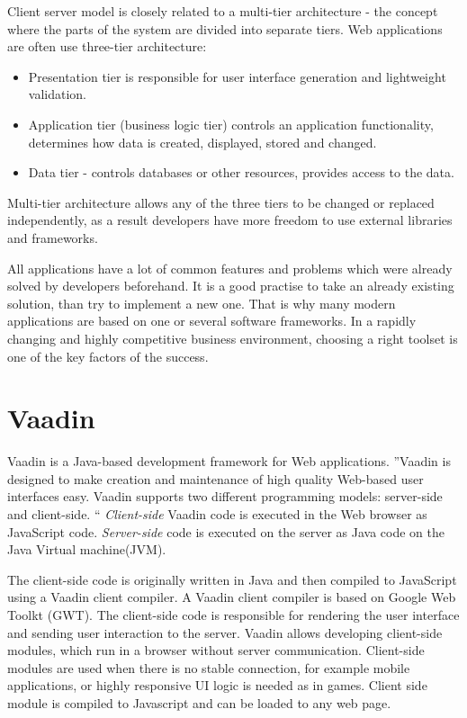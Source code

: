     	Client server model is closely related to a multi-tier architecture - the
    	concept where the parts of the system are divided into separate tiers. Web applications
    	 are often use three-tier architecture:
    	 \begin{itemize}
    	   \item Presentation tier is responsible for user interface generation and
    	   lightweight validation.
    	   \item Application tier (business logic tier) controls an application
    	   functionality, determines how data is created, displayed, stored and
    	   changed.
    	   \item Data tier - controls databases or other resources, provides access
    	   to the data.
    	 \end{itemize}
    	Multi-tier architecture allows any of the three tiers to be changed or
    	replaced independently, as a result developers have more freedom to use
    	external libraries and frameworks.
		
		All	applications have a lot of common features and problems which were already
		solved by developers beforehand. It is a good practise to take an already
		existing solution, than try to implement a new one. That is why many
		modern applications are based on one or several software frameworks. In a
		rapidly changing and highly competitive business environment, choosing a right toolset is one of
		the key factors of the success.	 	
		
  \section{Vaadin}
  \label{ch:vaadin}
    Vaadin is a Java-based development framework for Web applications. ''Vaadin
    is designed to make creation and maintenance of high quality Web-based user interfaces easy.
   Vaadin supports two different programming models: server-side and client-side. 
   `` \cite[pr1.1]{bookVaaidn}
   \emph{Client-side} Vaadin code is executed in the Web browser as JavaScript
   code.
   \emph{Server-side} code is executed on the server as Java code on the Java
   Virtual machine(JVM).

   The client-side code is originally written in Java and then
   compiled to JavaScript using a Vaadin client compiler. A Vaadin client
   compiler is based on Google Web Toolkt (GWT). The client-side code is
   responsible for rendering the user interface and sending user interaction to the server. Vaadin allows
   developing client-side modules, which run in a browser without server
   communication. Client-side modules are used when there is no stable
   connection, for example mobile applications, or  highly responsive UI logic
   is needed as in games. Client side module is compiled to Javascript and can be
   loaded to any web page.
   
